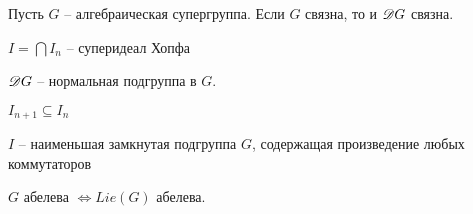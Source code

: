 \begin{theorem}
  Пусть $ G $ -- алгебраическая супергруппа. Если $ G $ связна, то и $ \mathscr{D} G $ связна.
  \proof {
    \qedhere
  }
\end{theorem}


\begin{proposition}
  $ I = \bigcap I_n $ -- суперидеал Хопфа
\end{proposition}

\begin{proposition}
  $ \mathscr{D} G $ -- нормальная подгруппа в $ G $.
\end{proposition}

\begin{proposition}
  $ I_{n+1} \subseteq I_{n} $
\end{proposition}

\begin{proposition}
  $ I $ -- наименьшая замкнутая подгруппа $ G $, содержащая произведение любых коммутаторов
\end{proposition}

\begin{proposition}
  $ G $ абелева $ \iff Lie(G) $ абелева.

\end{proposition}
